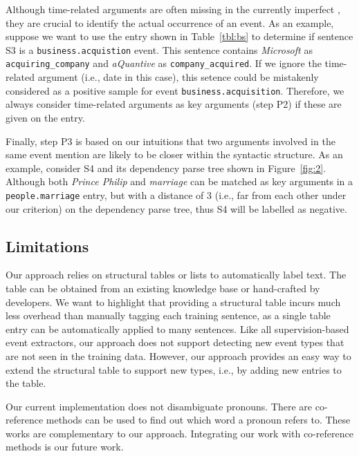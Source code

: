 Although time-related arguments are often missing in the currently imperfect \KBs, they are crucial to identify the actual occurrence of an
event. As an example, suppose we want to use the \CVT entry shown in Table~\ref{tbl:bs} to determine if sentence S3 is a
\texttt{business.acquistion} event. This sentence contains \emph{Microsoft} as \texttt{acquiring\_company} and \emph{aQuantive} as
\texttt{company\_acquired}. If we ignore the time-related argument (i.e., date in this case), this setence could be mistakenly considered
as a positive sample for event \texttt{business.acquisition}. Therefore, we always consider time-related arguments as key arguments (step
P2) if these are given on the \CVT entry.

Finally, step P3 is based on our intuitions that two arguments involved in the same event mention are likely to be closer within the
syntactic structure. As an example, consider S4 and its dependency parse tree shown in Figure~\ref{fig:2}. Although both \emph{Prince
Philip} and \emph{marriage} can be matched as key arguments in a  \texttt{people.marriage} entry, but with a distance of 3 (i.e., far from
each other under our criterion) on the dependency parse tree, thus S4 will be labelled as negative.

\subsection{Limitations}
Our approach relies on structural tables or lists to automatically label text. The table can be obtained from an existing knowledge base or
hand-crafted by developers. We want to highlight that providing a structural table incurs much less overhead than manually tagging each
training sentence, as a single table entry can be automatically applied to many sentences.  Like all supervision-based event extractors,
our approach does not support detecting new event types that are not seen in the training data. However, our approach provides an easy way
to extend the structural table to support new types, i.e., by adding new entries to the table.


Our current implementation does not disambiguate pronouns. There are co-reference methods\FIXME{~\cite{}} can be used to find out which
word a pronoun refers to. These works are complementary to our approach. Integrating our work with co-reference methods is our future work.
